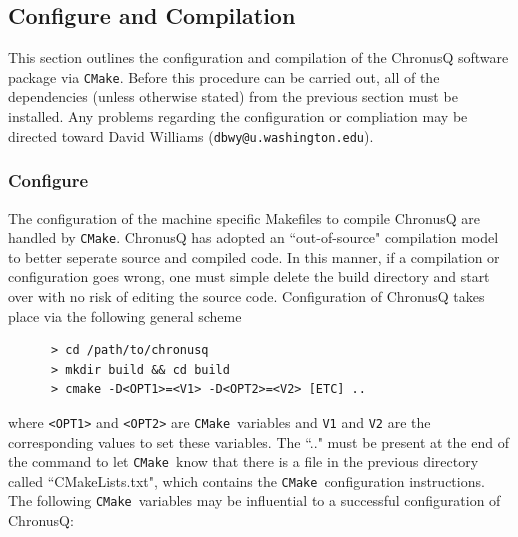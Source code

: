 \documentclass[12pt]{article}
\makeatletter
\newcommand{\DBWYContact}{David Williams (\texttt{dbwy@u.washington.edu})}
\newcommand{\CMake}{\texttt{CMake}}
\makeatother
\begin{document}
    \subsection{Configure and Compilation} \label{subsec:ChronusQConfigCompile}
    
    This section outlines the configuration and compilation of the ChronusQ
    software package via \CMake. Before this procedure can be carried out,
    all of the dependencies (unless otherwise stated) from the previous section
    must be installed. Any problems regarding the configuration or compliation
    may be directed toward \DBWYContact.

    \subsubsection{Configure} \label{subsubsec:ChronusQConfig}

    The configuration of the machine specific Makefiles to compile ChronusQ are
    handled by \CMake. ChronusQ has adopted an ``out-of-source" compilation model
    to better seperate source and compiled code. In this manner, if a compilation
    or configuration goes wrong, one must simple delete the build directory and 
    start over with no risk of editing the source code. Configuration of ChronusQ
    takes place via the following general scheme
    
    \begin{lstlisting}
      > cd /path/to/chronusq
      > mkdir build && cd build
      > cmake -D<OPT1>=<V1> -D<OPT2>=<V2> [ETC] ..
    \end{lstlisting}
    where \texttt{<OPT1>} and \texttt{<OPT2>} are \CMake~variables and \texttt{V1}
    and \texttt{V2} are the corresponding values to set these variables. The
    ``.." must be present at the end of the command to let \CMake~know that there
    is a file in the previous directory called ``CMakeLists.txt", which contains
    the \CMake~configuration instructions. The following \CMake~variables may be
    influential to a successful configuration of ChronusQ:
\end{document}
